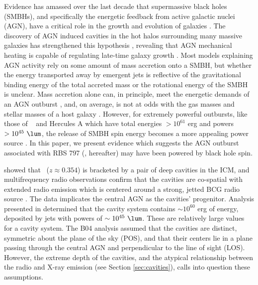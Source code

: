 \documentclass{emulateapj}
\begin{document}
Evidence has amassed over the last decade that supermassive black
holes (SMBHs), and specifically the energetic feedback from active
galactic nuclei (AGN), have a critical role in the growth and
evolution of galaxies \citep[\eg][]{1995ARA&A..33..581K, magorrian,
  1998A&A...331L...1S, 2000MNRAS.311..576K, 2000ApJ...539L...9F,
  2000ApJ...539L..13G, 2002ApJ...574..740T}. The discovery of AGN
induced cavities in the hot halos surrounding many massive galaxies
has strengthened this hypothesis \citep[see][for a review]{mcnamrev},
revealing that AGN mechanical heating is capable of regulating
late-time galaxy growth \citep[\eg][]{birzan04, dunn06, rafferty06,
  croton06, bower06, sijacki07}. Most models explaining AGN activity
rely on some amount of mass accretion onto a SMBH, but whether the
energy transported away by emergent jets is reflective of the
gravitational binding energy of the total accreted mass
\citep[see][for a review]{1984RvMP...56..255B} or the rotational
energy of the SMBH \citep[see][for a review]{2002NewAR..46..247M} is
unclear. Mass accretion alone can, in principle, meet the energetic
demands of an AGN outburst \citep[\eg][]{pizzolato05,
  2006MNRAS.372...21A}, and, on average, is not at odds with the gas
masses and stellar masses of a host galaxy
\citep[\eg][]{rafferty06}. However, for extremely powerful outbursts,
like those of \ms\ \citep{ms0735} and Hercules A \citep{herca} which
have total energies $> 10^{61}$ erg and powers $> 10^{45} ~\lum$, the
release of SMBH spin energy becomes a more appealing power source
\citep[\eg][]{msspin, minaspin}. In this paper, we present evidence
which suggests the AGN outburst associated with RBS 797 (\rbs,
hereafter) may have been powered by black hole spin.

\citet{schindler01} showed that \rbs\ ($z \approx 0.354$) is bracketed
by a pair of deep cavities in the ICM, and multifrequency radio
observations confirm that the cavities are co-spatial with extended
radio emission which is centered around a strong, jetted BCG radio
source \citep{2002astro.ph..1349D, gitti06, birzan08}. The data
implicates the central AGN as the cavities' progenitor. Analysis
presented in \citet[][hereafter B04]{birzan04} determined that the
cavity system contains $\sim 10^{60}$ erg of energy, deposited by jets
with powers of $\sim 10^{45} ~\lum$. These are relatively large values
for a cavity system. The B04 analysis assumed that the cavities are
distinct, symmetric about the plane of the sky (POS), and that their
centers lie in a plane passing through the central AGN and
perpendicular to the line of sight (LOS). However, the extreme depth
of the cavities, and the atypical relationship between the radio and
X-ray emission (see Section \ref{sec:cavities}), calls into question
these assumptions.
\end{document}
